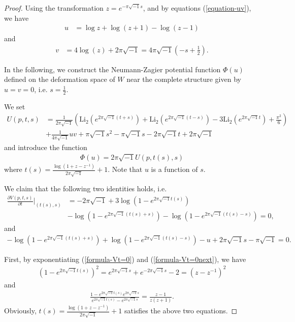 \documentclass[12pt]{amsart}
\begin{document}
\begin{proof}
    Using the transformation $z=e^{-\pi\sqrt{-1}s}$, and by equations (\ref{equation-uv}), 
    we have 
\begin{align} \label{formula-u}
    u&=\log z+\log\left(z+1\right)-\log\left(z-1\right)
\end{align}
and
\begin{align}
    v&=4\log\left(z\right)+2\pi\sqrt{-1}=4\pi\sqrt{-1}\left(-s+\frac{1}{2}\right).
\end{align}

In the following, we construct the Neumann-Zagier potential function $\Phi(u)$ defined on the deformation space of $W$ near the complete structure given by $u=v=0$, i.e. $s=\frac{1}{2}$.     

We set
\begin{align}
    U(p,t,s)&=\frac{1}{2\pi\sqrt{-1}}\left(\text{Li}_2(e^{2\pi\sqrt{-1}(t+s)})+\text{Li}_2(e^{2\pi\sqrt{-1}(t-s)})-3\text{Li}_2(e^{2\pi\sqrt{-1}t})+\frac{\pi^2}{6}\right)\\\nonumber
    &+\frac{1}{4\pi\sqrt{-1}}uv+\pi\sqrt{-1}s^2-\pi\sqrt{-1}s-2\pi\sqrt{-1}t+2\pi\sqrt{-1}
\end{align}
and introduce the function
\begin{align}
    \Phi(u)=2\pi\sqrt{-1}U(p,t(s),s)
\end{align}
where $t(s)=\frac{\log(1+z-z^{-1})}{2\pi\sqrt{-1}}+1$. Note that $u$ is a function of $s$.

We claim that the following two identities holds, i.e.
\begin{align} \label{formula-Vt=0}
    \frac{\partial V(p,t,s)}{\partial t}|_{(t(s),s)}&=-2\pi\sqrt{-1}+3\log(1-e^{2\pi\sqrt{-1}t(s)})\\\nonumber
    &-\log(1-e^{2\pi\sqrt{-1}(t(s)+s)})-\log(1-e^{2\pi\sqrt{-1}(t(s)-s)})=0,
\end{align}
and
\begin{align} \label{formula-Vt=0next}
    -\log(1-e^{2\pi\sqrt{-1}(t(s)+s)})+\log(1-e^{2\pi\sqrt{-1}(t(s)-s)})-u+2\pi\sqrt{-1}s-\pi\sqrt{-1}=0.
\end{align}

First, by exponentiating (\ref{formula-Vt=0}) and (\ref{formula-Vt=0next}), we have
\begin{align}
 (1-e^{2\pi\sqrt{-1}t(s)})^2= e^{2\pi\sqrt{-1}s}+e^{-2\pi\sqrt{-1}s}-2=(z-z^{-1})^2   
\end{align}
and
\begin{align}
 \frac{1-e^{2\pi\sqrt{-1}t(s)}e^{2\pi\sqrt{-1}s}}{e^{2\pi\sqrt{-1}t(s)}-e^{2\pi\sqrt{-1}s}}=\frac{z-1}{z(z+1)}.   
\end{align}
Obviously, $t(s)=\frac{\log(1+z-z^{-1})}{2\pi\sqrt{-1}}+1$ satisfies the above two equations. 


\end{proof}
\end{document}

